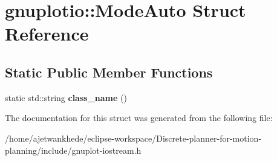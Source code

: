 \hypertarget{structgnuplotio_1_1ModeAuto}{}\section{gnuplotio\+:\+:Mode\+Auto Struct Reference}
\label{structgnuplotio_1_1ModeAuto}
\subsection*{Static Public Member Functions}
\begin{DoxyCompactItemize}
\item 
\mbox{\label{structgnuplotio_1_1ModeAuto_ac73f89a782ac32dd8bc7b8f7a7581523}} 
static std\+::string {\bfseries class\+\_\+name} ()
\end{DoxyCompactItemize}


The documentation for this struct was generated from the following file\+:\begin{DoxyCompactItemize}
\item 
/home/ajetwankhede/eclipse-\/workspace/\+Discrete-\/planner-\/for-\/motion-\/planning/include/gnuplot-\/iostream.\+h\end{DoxyCompactItemize}
